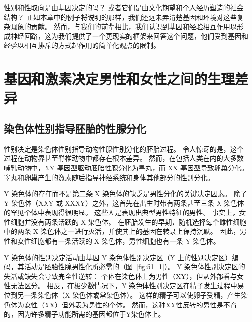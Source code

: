 性别和性取向是由基因决定的吗？
或者它们是由文化期望和个人经历塑造的社会结构？
正如本章中的例子将说明的那样，我们还远未弄清楚基因和环境对这些复杂现象的贡献。
然而，与我们的前辈相比，我们认识到基因和经验相互作用以形成神经回路，这为我们提供了一个更现实的框架来回答这个问题，他们受到基因和经验以相互排斥的方式起作用的简单化观点的限制。



\section{基因和激素决定男性和女性之间的生理差异}

\subsection{染色体性别指导胚胎的性腺分化}

性别决定是染色体性别指导动物性腺性别分化的胚胎过程。
令人惊讶的是，这个过程在动物界甚至脊椎动物中都存在根本差异。
然而，在包括人类在内的大多数哺乳动物中，XY 基因型驱动胚胎性腺分化为睾丸，而 XX 基因型导致卵巢分化。
睾丸和卵巢产生的激素随后指导神经系统和身体其他部分的性别分化。


Y 染色体的存在而不是第二条 X 染色体的缺乏是男性分化的关键决定因素。
除了 Y 染色体（XXY 或 XXXY）之外，这首先在出生时带有两条甚至三条 X 染色体的罕见个体中表现得很明显。
这些人是表现出典型男性特征的男性。
事实上，女性细胞并没有两条活跃的 X 染色体。
在胚胎发生的早期，随机选择每个雌性细胞中的两条 X 染色体之一进行灭活，并使其上的基因在转录上保持沉默。
因此，男性和女性细胞都有一条活跃的 X 染色体，男性细胞也有一条 Y 染色体。


Y 染色体的性别决定活动由基因 Y 染色体性别决定区（Y 上的性别决定区）编码，其活动是胚胎性腺男性化所必需的（图~\ref{fig:51_1}）。
Y 染色体性别决定区的失活或缺失会导致完全性逆转：
个体在染色体上为男性（XY），但从外部看与女性无法区分。
相反，在极少数情况下，Y 染色体性别决定区在精子发生过程中易位到另一条染色体（X 染色体或常染色体）。
这样的精子可以使卵子受精，产生染色体为女性（XX）但外表为男性的个体。
然而，这种XX性反转的男性是不育的，因为许多精子功能所需的基因都位于Y染色体上。


